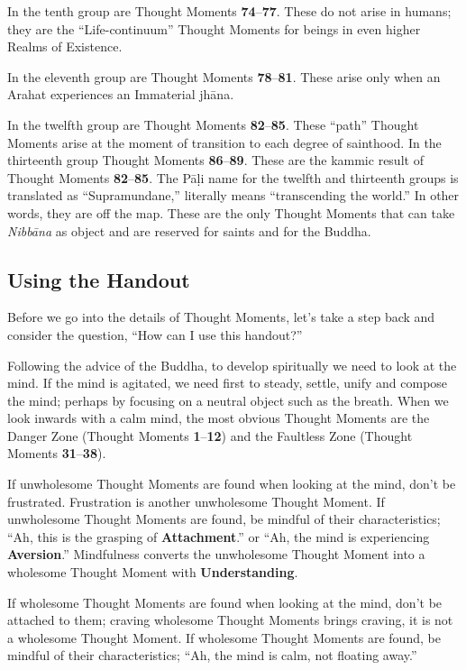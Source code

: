 In the tenth group are Thought Moments \textbf{74}--\textbf{77}. These do not arise in humans; they are the “Life-continuum” Thought Moments for beings in even higher Realms of Existence.

In the eleventh group are Thought Moments \textbf{78}--\textbf{81}. These arise only when an Arahat experiences an Immaterial jhāna.

In the twelfth group are Thought Moments \textbf{82}--\textbf{85}. These “path” Thought Moments arise at the moment of transition to each degree of sainthood. In the thirteenth group Thought Moments \textbf{86}--\textbf{89}. These are the kammic result of Thought Moments \textbf{82}--\textbf{85}. The Pāḷi name for the twelfth and thirteenth groups is translated as “Supramundane,” literally means “transcending the world.” In other words, they are off the map. These are the only Thought Moments that can take \textit{Nibbāna} as object and are reserved for saints and for the Buddha.

\subsection*{Using the Handout}

Before we go into the details of Thought Moments, let’s take a step back and consider the question, “How can I use this handout?”

Following the advice of the Buddha, to develop spiritually we need to look at the mind. If the mind is agitated, we need first to steady, settle, unify and compose the mind; perhaps by focusing on a neutral object such as the breath. When we look inwards with a calm mind, the most obvious Thought Moments are the Danger Zone (Thought Moments \textbf{1}--\textbf{12}) and the Faultless Zone (Thought Moments \textbf{31}--\textbf{38}).

If unwholesome Thought Moments are found when looking at the mind, don’t be frustrated. Frustration is another unwholesome Thought Moment. If unwholesome Thought Moments are found, be mindful of their characteristics; “Ah, this is the grasping of \textbf{Attachment}.” or “Ah, the mind is experiencing \textbf{Aversion}.” Mindfulness converts the unwholesome Thought Moment into a wholesome Thought Moment with \textbf{Understanding}.

If wholesome Thought Moments are found when looking at the mind, don’t be attached to them; craving wholesome Thought Moments brings craving, it is not a wholesome Thought Moment. If wholesome Thought Moments are found, be mindful of their characteristics; “Ah, the mind is calm, not floating away.”


